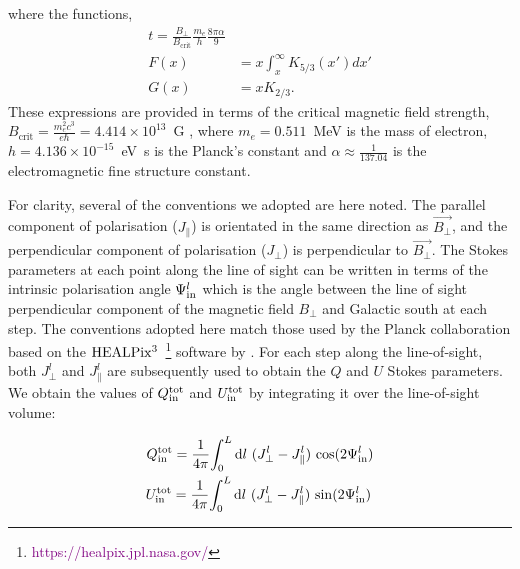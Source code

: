 \documentclass[usenatbib]{mnras}
\newcommand{\Andrew}[1]{\textcolor{dg}{#1}}
\begin{document}
where the functions,
\begin{align}
t = \frac{B_{\perp}}{B_{\mathrm{crit}}}\frac{m_{e}}{h} \frac{8\pi \alpha}{9}
\\
F(x) &= x \int_x^\infty K_{5/3}(x') dx'\\
G(x) &= x K_{2/3}.
\end{align}
These expressions are provided in terms of the critical magnetic field strength, $B_{\mathrm{crit}} = \frac{m_e^2c^3}{e\hbar} = 4.414 \times 10^{13}$~G , where $m_e = 0.511$~MeV is the mass of electron, $h = 4.136 \times 10^{-15}$~eV~s is the Planck's constant and $\alpha \approx \frac{1}{137.04}$ is the electromagnetic fine structure constant.


For clarity, several of the conventions we adopted are here noted. The parallel component of polarisation (${J_{\parallel}}$) is orientated in the same direction as  $\vec{B_{\perp}}$, and the perpendicular component of polarisation (${J_{\perp}}$) is perpendicular to $\vec{B_{\perp}}$. The Stokes parameters at each point along the line of sight can be written in terms of the intrinsic polarisation angle $\Psi^l_{\rm in}$ which is the angle between the line of sight perpendicular component of the magnetic field $B_{\perp}$ and Galactic south at each step. The conventions adopted here match those used by the Planck collaboration \cite{Planck_XIX} based on the $\rm HEALPix^3$~\footnote{\textcolor{purple}{https://healpix.jpl.nasa.gov/}} software by \cite{Healpix_2005}. For each step along the line-of-sight, both  ${J_{\perp}^l}$ and ${J_{\parallel}^l}$ are subsequently used to obtain the $Q$ and $U$ Stokes parameters. We obtain the values of $Q^{\rm tot}_{\rm in}$ and $U^{\rm tot}_{\rm in}$ by integrating it over the line-of-sight volume:

\begin{eqnarray}
Q_{\rm in}^{\rm tot} = \frac{1}{4\pi} {\int_0^L \mathrm{d}l \ ({J_{\perp}^l} - J_{\parallel}^l) \ {\cos}(2\Psi^l_{\rm in}) } \\
U_{\rm in}^{\rm tot} =\frac{1}{4\pi} {\int_0^L \mathrm{d}l \ ({J_{\perp}^l} - J_{\parallel}^l) \ {\sin}(2\Psi^l_{\rm in})} \,
\end{eqnarray}
\end{document}
